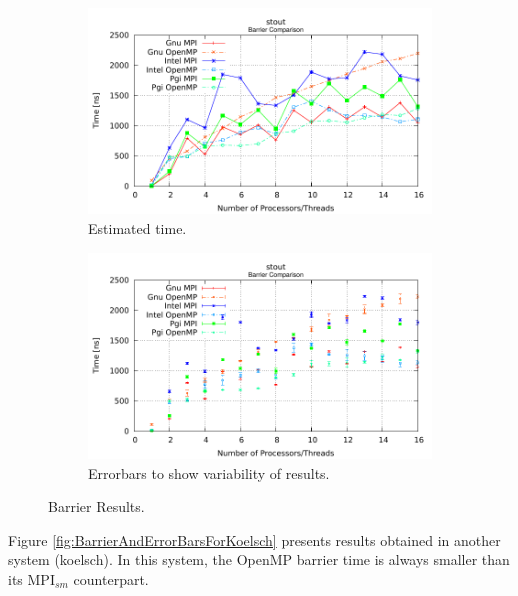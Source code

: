 \begin{figure} [h!]
    \centering
    \captionsetup{justification=centering, singlelinecheck=false}
    \begin{subfigure}{.6\textwidth}
      \centering
      \hspace*{-1.5cm} 
      \includegraphics[width=0.95\linewidth]{Plots/barrier/stout.pdf}
      \caption[]{Estimated time.}
      \label{fig:BarrierStout}
    \end{subfigure}%
    \begin{subfigure}{.6\textwidth}
      \centering
      \hspace*{-1.5cm} 
      \includegraphics[width=0.95\linewidth]{Plots/barrier/stoutError.pdf}
      \caption{Errorbars to show variability of results.}
      \label{fig:BarrierErrorBarsStout}
    \end{subfigure}
\caption{Barrier Results.}
\label{fig:BarrierAndErrorBarsForStout}
\end{figure}

\medskip

Figure \ref{fig:BarrierAndErrorBarsForKoelsch} presents results obtained in another system (koelsch). In this system, the OpenMP barrier time is always smaller than its MPI$_{sm}$ counterpart.

